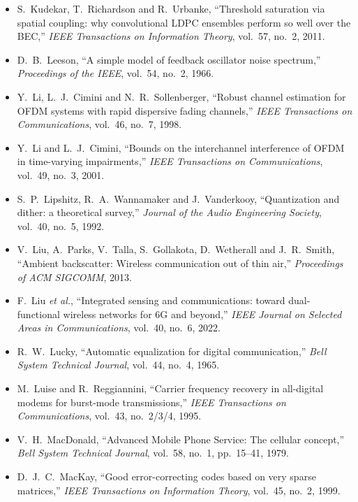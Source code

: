 \begin{itemize}[leftmargin=1.5em,itemindent=-1.5em,itemsep=1.5pt plus 1pt,parsep=0pt,topsep=4pt,label={}]
\item S.~Kudekar, T.~Richardson and R.~Urbanke, ``Threshold saturation via spatial coupling: why convolutional LDPC ensembles perform so well over the BEC,'' \emph{IEEE Transactions on Information Theory}, vol.~57, no.~2, 2011.
\item D.~B.~Leeson, ``A simple model of feedback oscillator noise spectrum,'' \emph{Proceedings of the IEEE}, vol.~54, no.~2, 1966.
\item Y.~Li, L.~J.~Cimini and N.~R.~Sollenberger, ``Robust channel estimation for OFDM systems with rapid dispersive fading channels,'' \emph{IEEE Transactions on Communications}, vol.~46, no.~7, 1998.
\item Y.~Li and L.~J.~Cimini, ``Bounds on the interchannel interference of OFDM in time-varying impairments,'' \emph{IEEE Transactions on Communications}, vol.~49, no.~3, 2001.
\item S.~P.~Lipshitz, R.~A.~Wannamaker and J.~Vanderkooy, ``Quantization and dither: a theoretical survey,'' \emph{Journal of the Audio Engineering Society}, vol.~40, no.~5, 1992.
\item V.~Liu, A.~Parks, V.~Talla, S.~Gollakota, D.~Wetherall and J.~R.~Smith, ``Ambient backscatter: Wireless communication out of thin air,'' \emph{Proceedings of ACM SIGCOMM}, 2013.
\item F.~Liu \emph{et al.}, ``Integrated sensing and communications: toward dual-functional wireless networks for 6G and beyond,'' \emph{IEEE Journal on Selected Areas in Communications}, vol.~40, no.~6, 2022.
\item R.~W.~Lucky, ``Automatic equalization for digital communication,'' \emph{Bell System Technical Journal}, vol.~44, no.~4, 1965.
\item M.~Luise and R.~Reggiannini, ``Carrier frequency recovery in all-digital modems for burst-mode transmissions,'' \emph{IEEE Transactions on Communications}, vol.~43, no.~2/3/4, 1995.
\item V.~H.~MacDonald, ``Advanced Mobile Phone Service: The cellular concept,'' \emph{Bell System Technical Journal}, vol.~58, no.~1, pp.~15--41, 1979.
\item D.~J.~C.~MacKay, ``Good error-correcting codes based on very sparse matrices,'' \emph{IEEE Transactions on Information Theory}, vol.~45, no.~2, 1999.

\end{itemize}
